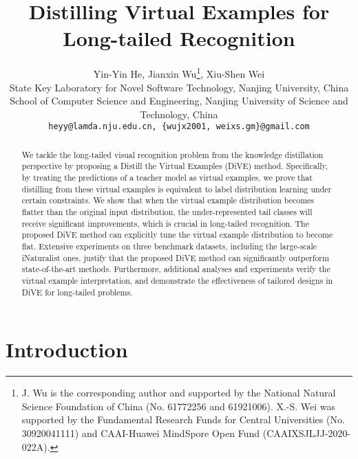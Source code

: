 \documentclass[10pt,twocolumn,letterpaper]{article}
\begin{document}
\title{Distilling Virtual Examples for Long-tailed Recognition}

\author{Yin-Yin He, Jianxin Wu\thanks{J. Wu is the corresponding author and supported by the National Natural Science Foundation of China (No. 61772256 and 61921006). X.-S. Wei was supported by the Fundamental Research Funds for Central Universities (No. 30920041111) and CAAI-Huawei MindSpore Open Fund (CAAIXSJLJJ-2020-022A).}, Xiu-Shen Wei \\
\small State Key Laboratory for Novel Software Technology, Nanjing University, China \\
\small School of Computer Science and Engineering, Nanjing University of Science and Technology, China \\
{\tt\small heyy@lamda.nju.edu.cn, \{wujx2001, weixs.gm\}@gmail.com}}

\maketitle
\ificcvfinal\thispagestyle{empty}\fi

\begin{abstract}
   We tackle the long-tailed visual recognition problem from the knowledge distillation perspective by proposing a Distill the Virtual Examples (DiVE) method. Specifically, by treating the predictions of a teacher model as virtual examples, we prove that distilling from these virtual examples is equivalent to label distribution learning under certain constraints. We show that when the virtual example distribution becomes flatter than the original input distribution, the under-represented tail classes will receive significant improvements, which is crucial in long-tailed recognition. The proposed DiVE method can explicitly tune the virtual example distribution to become flat. Extensive experiments on three benchmark datasets, including the large-scale iNaturalist ones, justify that the proposed DiVE method can significantly outperform state-of-the-art methods. Furthermore, additional analyses and experiments verify the virtual example interpretation, and demonstrate the effectiveness of tailored designs in DiVE for long-tailed problems.
\end{abstract}

\section{Introduction}
\end{document}
